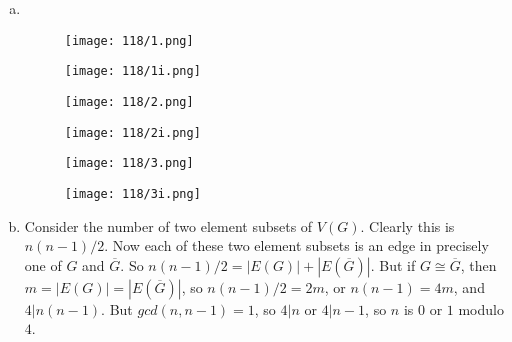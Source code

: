 \begin{enumerate}[(a)]
	\item \ \\

        \begin{figure}[H]
        \centering
        \texttt{[image: 118/1.png]}
        \end{figure}

        \begin{figure}[H]
        \centering
        \texttt{[image: 118/1i.png]}
        \end{figure}

        \begin{figure}[H]
        \centering
        \texttt{[image: 118/2.png]}
        \end{figure}

        \begin{figure}[H]
        \centering
        \texttt{[image: 118/2i.png]}
        \end{figure}

        \begin{figure}[H]
        \centering
        \texttt{[image: 118/3.png]}
        \end{figure}

        \begin{figure}[H]
        \centering
        \texttt{[image: 118/3i.png]}
        \end{figure}

	\item Consider the number of two element subsets of $V(G)$. Clearly this
		is $n(n-1)/2$. Now each of these two element subsets is an edge in precisely
		one of $G$ and $\overline{G}$. So $n(n-1)/2=|E(G)|+|E(\overline{G})|$.
	But if $G \cong \overline{G}$, then $m=|E(G)|=|E(\overline{G})|$, so
	$n(n-1)/2=2m$, or $n(n-1)=4m$, and $4|n(n-1)$. But $gcd(n,n-1)=1$, so $4|n$ or
	$4|n-1$, so $n$ is $0$ or $1$ modulo $4$.
\end{enumerate}
